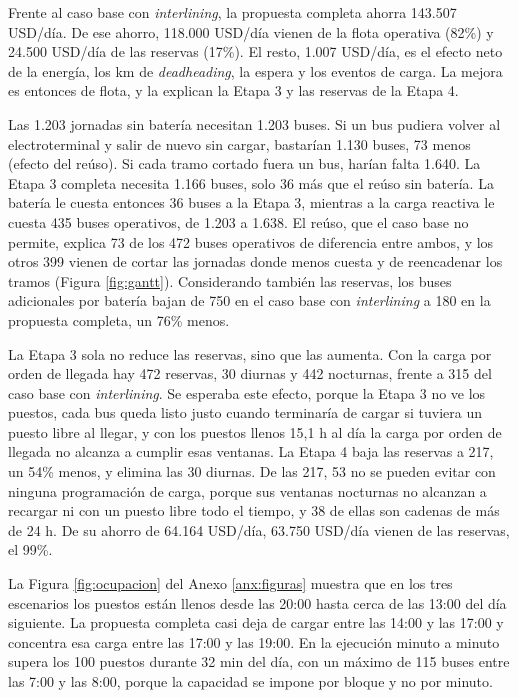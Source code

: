 Frente al caso base con \textit{interlining}, la propuesta completa ahorra 143.507 USD/día. De ese ahorro, 118.000 USD/día vienen de la flota operativa (82\%) y 24.500 USD/día de las reservas (17\%). El resto, 1.007 USD/día, es el efecto neto de la energía, los km de \textit{deadheading}, la espera y los eventos de carga. La mejora es entonces de flota, y la explican la Etapa 3 y las reservas de la Etapa 4.

Las 1.203 jornadas sin batería necesitan 1.203 buses. Si un bus pudiera volver al electroterminal y salir de nuevo sin cargar, bastarían 1.130 buses, 73 menos (efecto del reúso). Si cada tramo cortado fuera un bus, harían falta 1.640. La Etapa 3 completa necesita 1.166 buses, solo 36 más que el reúso sin batería. La batería le cuesta entonces 36 buses a la Etapa 3, mientras a la carga reactiva le cuesta 435 buses operativos, de 1.203 a 1.638. El reúso, que el caso base no permite, explica 73 de los 472 buses operativos de diferencia entre ambos, y los otros 399 vienen de cortar las jornadas donde menos cuesta y de reencadenar los tramos (Figura \ref{fig:gantt}). Considerando también las reservas, los buses adicionales por batería bajan de 750 en el caso base con \textit{interlining} a 180 en la propuesta completa, un 76\% menos.

La Etapa 3 sola no reduce las reservas, sino que las aumenta. Con la carga por orden de llegada hay 472 reservas, 30 diurnas y 442 nocturnas, frente a 315 del caso base con \textit{interlining}. Se esperaba este efecto, porque la Etapa 3 no ve los puestos, cada bus queda listo justo cuando terminaría de cargar si tuviera un puesto libre al llegar, y con los puestos llenos 15,1 h al día la carga por orden de llegada no alcanza a cumplir esas ventanas. La Etapa 4 baja las reservas a 217, un 54\% menos, y elimina las 30 diurnas. De las 217, 53 no se pueden evitar con ninguna programación de carga, porque sus ventanas nocturnas no alcanzan a recargar ni con un puesto libre todo el tiempo, y 38 de ellas son cadenas de más de 24 h. De su ahorro de 64.164 USD/día, 63.750 USD/día vienen de las reservas, el 99\%.

La Figura \ref{fig:ocupacion} del Anexo \ref{anx:figuras} muestra que en los tres escenarios los puestos están llenos desde las 20:00 hasta cerca de las 13:00 del día siguiente. La propuesta completa casi deja de cargar entre las 14:00 y las 17:00 y concentra esa carga entre las 17:00 y las 19:00. En la ejecución minuto a minuto supera los 100 puestos durante 32 min del día, con un máximo de 115 buses entre las 7:00 y las 8:00, porque la capacidad se impone por bloque y no por minuto.


